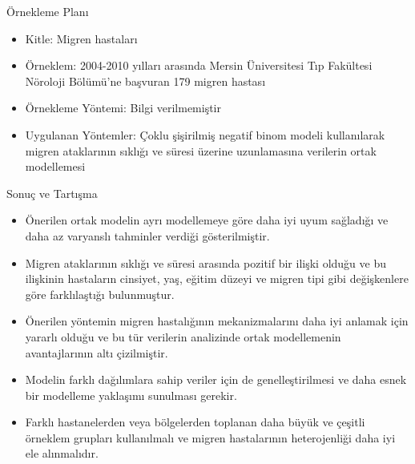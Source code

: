 \documentclass{beamer}
\begin{document}
\begin{frame}{Örnekleme Planı}
\begin{itemize}
  \item Kitle: Migren hastaları
  \item Örneklem: 2004-2010 yılları arasında Mersin Üniversitesi Tıp Fakültesi Nöroloji Bölümü’ne başvuran 179 migren hastası
  \item Örnekleme Yöntemi: Bilgi verilmemiştir
  \item Uygulanan Yöntemler: Çoklu şişirilmiş negatif binom modeli kullanılarak migren ataklarının sıklığı ve süresi üzerine uzunlamasına verilerin ortak modellemesi
\end{itemize}
\end{frame}

\begin{frame}{Sonuç ve Tartışma}
\begin{itemize}
  \item Önerilen ortak modelin ayrı modellemeye göre daha iyi uyum sağladığı ve daha az varyanslı tahminler verdiği gösterilmiştir.
  \item Migren ataklarının sıklığı ve süresi arasında pozitif bir ilişki olduğu ve bu ilişkinin hastaların cinsiyet, yaş, eğitim düzeyi ve migren tipi gibi değişkenlere göre farklılaştığı bulunmuştur.
  \item Önerilen yöntemin migren hastalığının mekanizmalarını daha iyi anlamak için yararlı olduğu ve bu tür verilerin analizinde ortak modellemenin avantajlarının altı çizilmiştir.
  \item Modelin farklı dağılımlara sahip veriler için de genelleştirilmesi ve daha esnek bir modelleme yaklaşımı sunulması gerekir. 
   \item Farklı hastanelerden veya bölgelerden toplanan daha büyük ve çeşitli örneklem grupları kullanılmalı ve migren hastalarının heterojenliği daha iyi ele alınmalıdır.
\end{itemize}
\end{frame}
\end{document}
